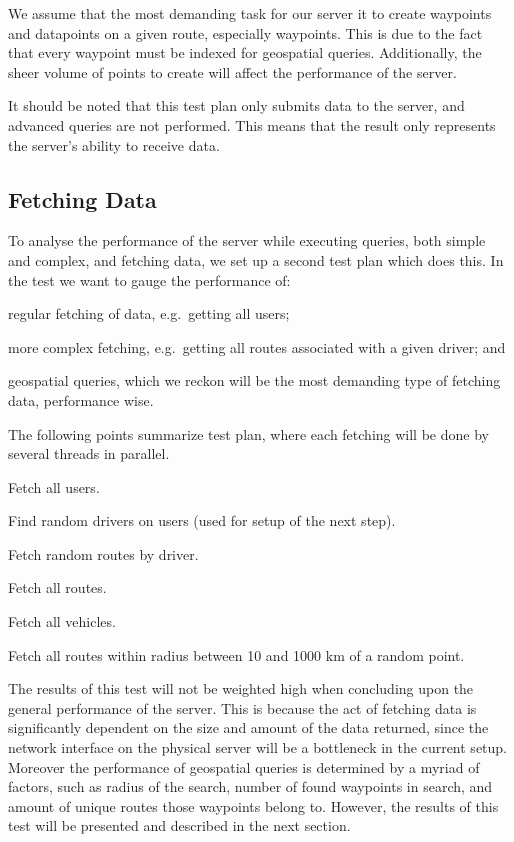 We assume that the most demanding task for our server it to create waypoints and datapoints on a given route, especially waypoints.
This is due to the fact that every waypoint must be indexed for geospatial queries.
Additionally, the sheer volume of points to create will affect the performance of the server.

It should be noted that this test plan only submits data to the server, and advanced queries are not performed.
This means that the result only represents the server's ability to receive data.

\subsection{Fetching Data}
To analyse the performance of the server while executing queries, both simple and complex, and fetching data, we set up a second test plan which does this.
In the test we want to gauge the performance of:
\begin{enumberate*}
    \item regular fetching of data, e.g.~getting all users;
    \item more complex fetching, e.g.~getting all routes associated with a given driver; and
    \item geospatial queries, which we reckon will be the most demanding type of fetching data, performance wise.
\end{enumberate*}

The following points summarize test plan, where each fetching will be done by several threads in parallel.
\begin{enumberate}
    \item Fetch all users.
    \item Find random drivers on users (used for setup of the next step).
    \item Fetch random routes by driver.
    \item Fetch all routes.
    \item Fetch all vehicles.
    \item Fetch all routes within radius between 10 and 1000 km of a random point.
\end{enumberate}

The results of this test will not be weighted high when concluding upon the general performance of the server.
This is because the act of fetching data is significantly dependent on the size and amount of the data returned, since the network interface on the physical server will be a bottleneck in the current setup.
Moreover the performance of geospatial queries is determined by a myriad of factors, such as radius of the search, number of found waypoints in search, and amount of unique routes those waypoints belong to.
However, the results of this test will be presented and described in the next section.
